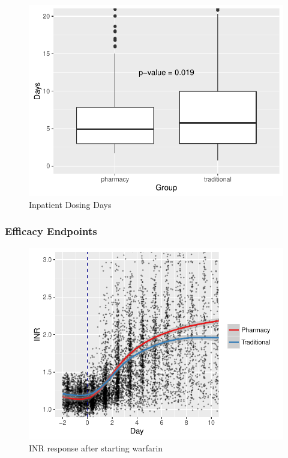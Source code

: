 \documentclass[]{article}
\begin{document}
\begin{figure}[H]
\centering
\includegraphics{warfarin_analysis_ASHP_files/figure-latex/dosing_days-1.pdf}
\caption{Inpatient Dosing Days}
\end{figure}

\subsubsection{Efficacy Endpoints}\label{efficacy-endpoints}

\begin{figure}[H]
\centering
\includegraphics{warfarin_analysis_ASHP_files/figure-latex/inr-1.pdf}
\caption{INR response after starting warfarin}
\end{figure}
\end{document}
